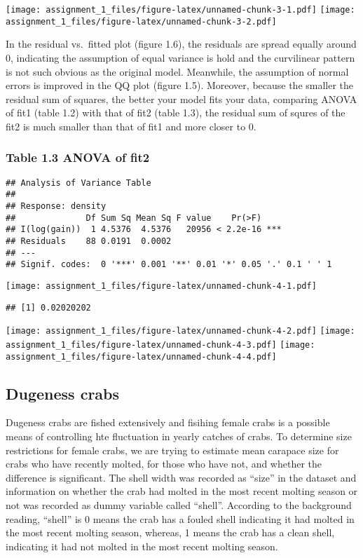 \documentclass[]{article}
\begin{document}
\texttt{[image: assignment\_1\_files/figure-latex/unnamed-chunk-3-1.pdf]}
\texttt{[image: assignment\_1\_files/figure-latex/unnamed-chunk-3-2.pdf]}

In the residual vs.~fitted plot (figure 1.6), the residuals are spread
equally around 0, indicating the assumption of equal variance is hold
and the curvilinear pattern is not such obvious as the original model.
Meanwhile, the assumption of normal errors is improved in the QQ plot
(figure 1.5). Moreover, because the smaller the residual sum of squares,
the better your model fits your data, comparing ANOVA of fit1 (table
1.2) with that of fit2 (table 1.3), the residual sum of squres of the
fit2 is much smaller than that of fit1 and more closer to 0.

\subsubsection{Table 1.3 ANOVA of fit2}\label{table-1.3-anova-of-fit2}

\begin{verbatim}
## Analysis of Variance Table
## 
## Response: density
##              Df Sum Sq Mean Sq F value    Pr(>F)    
## I(log(gain))  1 4.5376  4.5376   20956 < 2.2e-16 ***
## Residuals    88 0.0191  0.0002                      
## ---
## Signif. codes:  0 '***' 0.001 '**' 0.01 '*' 0.05 '.' 0.1 ' ' 1
\end{verbatim}

\texttt{[image: assignment\_1\_files/figure-latex/unnamed-chunk-4-1.pdf]}

\begin{verbatim}
## [1] 0.02020202
\end{verbatim}

\texttt{[image: assignment\_1\_files/figure-latex/unnamed-chunk-4-2.pdf]}
\texttt{[image: assignment\_1\_files/figure-latex/unnamed-chunk-4-3.pdf]}
\texttt{[image: assignment\_1\_files/figure-latex/unnamed-chunk-4-4.pdf]}

\subsection{Dugeness crabs}\label{dugeness-crabs}

Dugeness crabs are fished extensively and fisihing female crabs is a
possible means of controlling hte fluctuation in yearly catches of
crabs. To determine size restrictions for female crabs, we are trying to
estimate mean carapace size for crabs who have recently molted, for
those who have not, and whether the difference is significant. The shell
width was recorded as ``size'' in the dataset and information on whether
the crab had molted in the most recent molting season or not was
recorded as dummy variable called ``shell''. According to the background
reading, ``shell'' is 0 means the crab has a fouled shell indicating it
had molted in the most recent molting season, whereas, 1 means the crab
has a clean shell, indicating it had not molted in the most recent
molting season.
\end{document}
